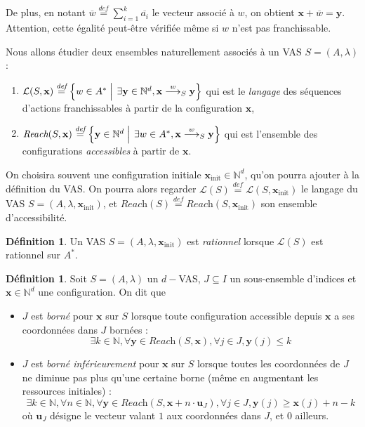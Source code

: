 \documentclass[a4paper,final]{article}
\theoremstyle{definition}
\newtheorem{Definition}[Theorem]{Définition}
\let\leq\leqslant
\let\geq\geqslant
\newcommand{\set}[2]{\left\{#1\mathrel{\left|\vphantom{#1}\vphantom{#2}\right.}#2\right\}}
\newcommand{\defeq}{\ensuremath{\stackrel{\textit{def}}{=}}}
\newcommand{\N}{\ensuremath{\mathbb{N}}}
\newcommand{\lang}{\ensuremath{\mathcal{L}}}
\newcommand{\reach}{\ensuremath{\textit{Reach}}}
\newcommand{\trans}[2]{\ensuremath{\stackrel{#1}{\longrightarrow}_{#2}}}
\newcommand{\vect}[1]{\ensuremath{\mathbf{#1}}}
\newcommand{\xinit}{\ensuremath{\vect{x}_\text{init}}}
\newcommand{\valeur}[1]{\ensuremath{\overline{#1}}}
\newcommand{\unite}[1]{\ensuremath{\vect{u}_{#1}}}
\begin{document}
De plus, en notant $\valeur{w}\defeq \sum^k_{i=1} \valeur{a_i}$ le vecteur associé à $w$, on obtient $\vect{x} +\valeur{w} = \vect{y}$.
Attention, cette égalité peut-être vérifiée même si $w$ n'est pas franchissable.
\vspace{3mm}

Nous allons étudier deux ensembles naturellement associés à un VAS $S=(A,\lambda)$ :
\begin{enumerate}
    \item 
    $\lang(S,\vect{x})\defeq \set{w\in A^\ast} {\exists \vect{y}\in\N^d, \vect{x}\trans{w}{S}\vect{y}}$ qui est le \emph{langage} des séquences d'actions franchissables à partir de la configuration $\vect{x}$,
    
    \item $\reach(S,\vect{x})\defeq \set{\vect{y}\in\N^d} {\exists w\in A^\ast, \vect{x}\trans{w}{S} \vect{y}}$ qui est l'ensemble des configurations \emph{accessibles} à partir de $\vect{x}$. 
\end{enumerate}

\vspace{2mm}
On choisira souvent une configuration initiale $\xinit\in\N^d$, qu'on pourra ajouter à la définition du VAS.
On pourra alors regarder $\lang(S) \defeq \lang(S,\xinit)$ le langage du VAS $S = (A,\lambda,\xinit)$, et $\reach(S) \defeq \reach(S,\xinit)$ son ensemble d'accessibilité.

\begin{Definition}
Un VAS $S = (A,\lambda,\xinit)$ est \emph{rationnel} lorsque $\lang(S)$ est rationnel sur $A^\ast$.
\end{Definition}

\begin{Definition}
Soit $S = (A,\lambda)$ un $d-$VAS,
$J\subseteq I$ un sous-ensemble d'indices et $\vect{x}\in\N^d$ une configuration.
On dit que
\begin{itemize}
    \item $J$ est \emph{borné} pour $\vect{x}$ sur $S$ lorsque toute configuration accessible depuis $\vect{x}$ a ses coordonnées dans $J$ bornées :
    $$\exists k\in\N, \forall \vect{y}\in\reach(S,\vect{x}), \forall j\in J, \vect{y}(j)\leq k$$
    
    \item $J$ est \emph{borné inférieurement} pour $\vect{x}$ sur $S$ lorsque toutes les coordonnées de $J$ ne diminue pas plus qu'une certaine borne (même en augmentant les ressources initiales) :
    $$\exists k\in\N, \forall n\in\N, \forall \vect{y}\in\reach(S,\vect{x} + n\cdot\unite{J}), \forall j\in J, \vect{y}(j)\geq \vect{x}(j)+n-k$$
    où $\unite{J}$ désigne le vecteur valant $1$ aux coordonnées dans $J$, et $0$ ailleurs.
\end{itemize}
\end{Definition}
\end{document}

